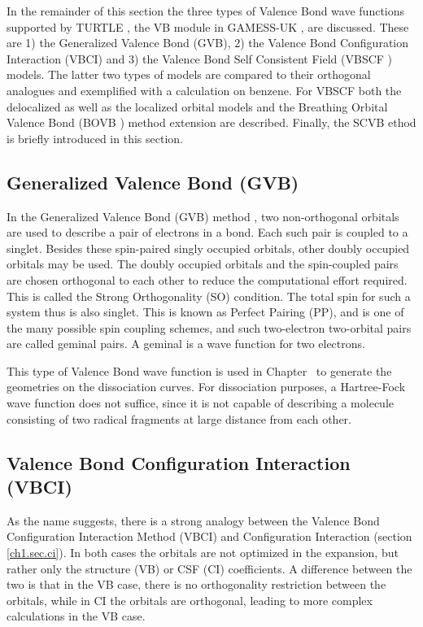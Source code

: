 In the remainder of this section the three types of Valence Bond wave functions supported by TURTLE \cite{turtle}, the VB module in GAMESS-UK \cite{gamess}, are discussed. These are 1) the Generalized Valence Bond (GVB), 2) the Valence Bond Configuration Interaction (VBCI) and 3) the Valence Bond Self Consistent Field (VBSCF \cite{vbscf1,vbscf2}) models. The latter two types of models are compared to their orthogonal analogues and exemplified with a calculation on benzene. For VBSCF both the delocalized as well as the localized orbital models and the Breathing Orbital Valence Bond (BOVB \cite{bovb1,bovb2,bovb3}) method extension are described. Finally, the SCVB ethod \cite{scvb1,scvb2,scvb3} is briefly introduced in this section.

\subsection{Generalized Valence Bond (GVB)}

In the Generalized Valence Bond (GVB) method \cite{jensen,gvb1,gvb2,gvb3,gvb4}, two non-orthogonal orbitals are used to describe a pair of electrons in a bond. Each such pair is coupled to a singlet. Besides these spin-paired singly occupied orbitals, other doubly occupied orbitals may be used. The doubly occupied orbitals and the spin-coupled pairs are chosen orthogonal to each other to reduce the computational effort required. This is called the Strong Orthogonality (SO) condition. The total spin for such a system thus is also singlet. This is known as Perfect Pairing (PP), and is one of the many possible spin coupling schemes, and such two-electron two-orbital pairs are called geminal pairs. A geminal is a wave function for two electrons. 

This type of Valence Bond wave function is used in Chapter \chdissociation\ to generate the geometries on the dissociation curves. For dissociation purposes, a Hartree-Fock wave function does not suffice, since it is not capable of describing a molecule consisting of two radical fragments at large distance from each other.

\subsection{Valence Bond Configuration Interaction (VBCI)}

As the name suggests, there is a strong analogy between the Valence Bond Configuration Interaction Method (VBCI) and Configuration Interaction (section \ref{ch1.sec.ci}). In both cases the orbitals are not optimized in the expansion, but rather only the structure (VB) or CSF (CI) coefficients. A difference between the two is that in the VB case, there is no orthogonality restriction between the orbitals, while in CI the orbitals are orthogonal, leading to more complex calculations in the VB case.

